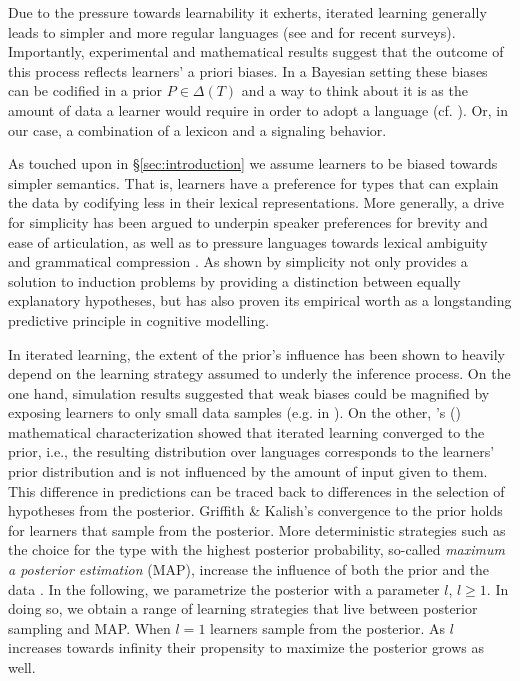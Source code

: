 \documentclass[a4paper]{article}
\newcommand{\citeposs}[2][]{\citeauthor{#2}'s (\citeyear[#1]{#2})}
\begin{document}
Due to the pressure towards learnability it exherts, iterated learning generally leads to simpler and more regular languages (see \citealt{kirby+etal:2014} and \citealt{tamariz+kirby:2016} for recent surveys). Importantly, experimental and mathematical results suggest that the outcome of this process reflects learners' a priori biases. In a Bayesian setting these biases can be codified in a prior $P \in \Delta(T)$ and a way to think about it is as the amount of data a learner would require in order to adopt a language (cf. \citealt[450]{griffiths+kalish:2007}). Or, in our case, a combination of a lexicon and a signaling behavior. 

As touched upon in \S\ref{sec:introduction} we assume learners to be biased towards simpler semantics. That is, learners have a preference for types that can explain the data by codifying less in their lexical representations. More generally, a drive for simplicity has been argued to underpin speaker preferences for brevity and ease of articulation, as well as to pressure languages towards lexical ambiguity and grammatical compression \citep{zipf:1949,grice:1975,piantadosi+etal:2012b, kirby+etal:2015}. As shown by \citet{chater+vitanyi:2003} simplicity not only provides a solution to induction problems by providing a distinction between equally explanatory hypotheses, but has also proven its empirical worth as a longstanding predictive principle in cognitive modelling.  

In iterated learning, the extent of the prior's influence has been shown to heavily depend on the learning strategy assumed to underly the inference process. On the one hand, simulation results suggested that weak biases could be magnified by exposing learners to only small data samples (e.g. in \citealt{brighton:2002}). On the other, \citeposs{griffiths+kalish:2007} mathematical characterization showed that iterated learning converged to the prior, i.e., the resulting distribution over languages corresponds to the learners' prior distribution and is not influenced by the amount of input given to them. This difference in predictions can be traced back to differences in the selection of hypotheses from the posterior. Griffith \& Kalish's convergence to the prior holds for learners that sample from the posterior. More deterministic strategies such as the choice for the type with the highest posterior probability, so-called {\it maximum a posterior estimation} (MAP), increase the influence of both the prior and the data \citep{griffiths+kalish:2007,kirby+etal:2007}. In the following, we parametrize the posterior with a parameter $l$, $l \geq 1$. In doing so, we obtain a range of learning strategies that live between posterior sampling and MAP. When $l = 1$ learners sample from the posterior. As $l$ increases towards infinity their propensity to maximize the posterior grows as well. 
\end{document}
